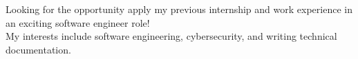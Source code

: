 

\begin{cvparagraph}
Looking for the opportunity apply my previous internship and work experience in an exciting software engineer role!
\\My interests include software engineering, cybersecurity, and writing technical documentation.
\end{cvparagraph}
